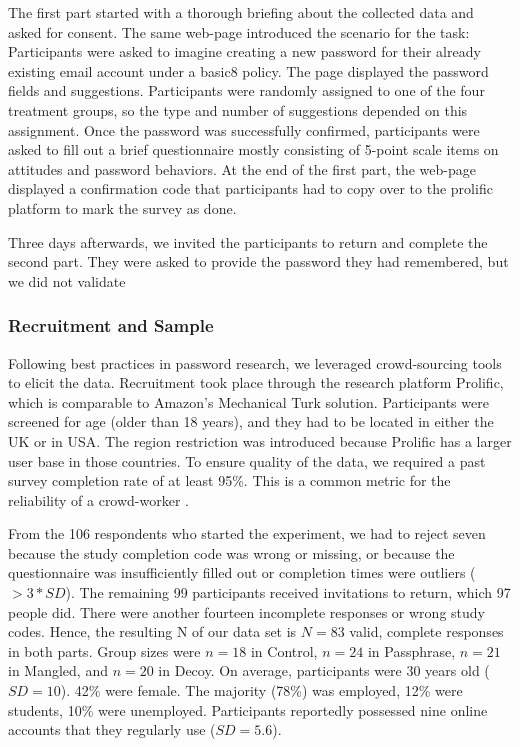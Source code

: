 The first part started with a thorough briefing about the collected data and asked for consent. The same web-page introduced the scenario for the task: Participants were asked to imagine creating a new password for their already existing email account under a basic8 policy. The page displayed the password fields and suggestions. Participants were randomly assigned to one of the four treatment groups, so the type and number of suggestions depended on this assignment. Once the password was successfully confirmed, participants were asked to fill out a brief questionnaire mostly consisting of 5-point scale items on attitudes and password behaviors. At the end of the first part, the web-page displayed a confirmation code that participants had to copy over to the prolific platform to mark the survey as done. 

Three days afterwards, we invited the participants to return and complete the second part. They were asked to provide the password they had remembered, but we did not validate 

\subsubsection{Recruitment and Sample}
Following best practices in password research, we leveraged crowd-sourcing tools to elicit the data. Recruitment took place through the research platform Prolific, which is comparable to Amazon's Mechanical Turk solution. Participants were screened for age (older than 18 years), and they had to be located in either the UK or in USA. The region restriction was introduced because Prolific has a larger user base in those countries. To ensure quality of the data, we required a past survey completion rate of at least 95\%. This is a common metric for the reliability of a crowd-worker \cite{Ross2010WhoAreTurkers}. 

From the 106 respondents who started the experiment, we had to reject seven because the study completion code was wrong or missing, or because the questionnaire was insufficiently filled out or completion times were outliers ($> 3*SD$). The remaining 99 participants received invitations to return, which 97 people did. There were another fourteen incomplete responses or wrong study codes. Hence, the resulting N of our data set is $N = 83$ valid, complete responses in both parts. Group sizes were $n=18$ in Control, $n=24$ in Passphrase, $n=21$ in Mangled, and $n=20$ in Decoy. On average, participants were 30 years old ($SD=10$). 42\% were female. The majority (78\%) was employed, 12\% were students, 10\% were unemployed. Participants reportedly possessed nine online accounts that they regularly use ($SD=5.6$). 

